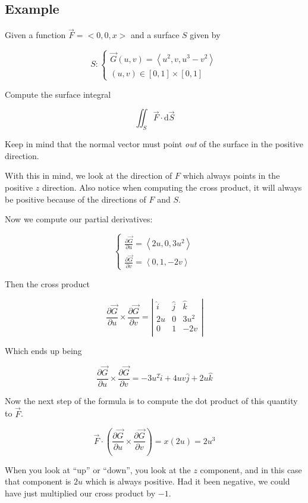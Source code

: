 \documentclass{article}
\newcommand{\D}[1]{\mathrm{d}#1}
\newcommand{\partialfrac}[2]{\dfrac{\partial #1}{\partial #2}}
\begin{document}
\subsection*{Example}

Given a function $\vec{F}=<0, 0, x>$ and a surface $S$ given by

\[
S: \begin{cases}
  \vec{G}(u,v) = \left<u^2, v, u^3-v^2\right> \\
  (u,v) \in [0,1] \times [0,1]
\end{cases}
\]

Compute the surface integral

\[
\iint_S \vec{F} \cdot \D{\vec{S}}
\]

Keep in mind that the normal vector must point \textit{out} of the surface in the positive direction.

With this in mind, we look at the direction of $F$ which always points in the positive $z$ direction. Also notice when computing the cross product, it will always be positive because of the directions of $F$ and $S$.

Now we compute our partial derivatives:

\[
\begin{cases}
  \frac{\partial \vec{G}}{\partial u} = \left<2 u, 0, 3 u^2\right> \\
  \frac{\partial \vec{G}}{\partial v} = \left<0, 1, -2 v\right>
\end{cases}
\]

Then the cross product

\[
\partialfrac{\vec{G}}{u} \times \partialfrac{\vec{G}}{v} = \left|\begin{array}{ccc}
  \hat{i} & \hat{j} & \hat{k} \\
  2u & 0 & 3 u^2 \\
  0 & 1 & -2 v \\
\end{array}\right|
\]

Which ends up being

\[
\partialfrac{\vec{G}}{u} \times \partialfrac{\vec{G}}{v} = -3u ^2 \hat{i} + 4 u v \hat{j} + 2 u \hat{k}
\]

Now the next step of the formula is to compute the dot product of this quantity to $\vec{F}$.

\[
\vec{F} \cdot \left(\partialfrac{\vec{G}}{u} \times \partialfrac{\vec{G}}{v}\right) = x \left(2 u\right) = 2 u^3
\]

When you look at ``up'' or ``down'', you look at the $z$ component, and in this case that component is $2 u$ which is always positive. Had it been negative, we could have just multiplied our cross product by $-1$.
\end{document}
